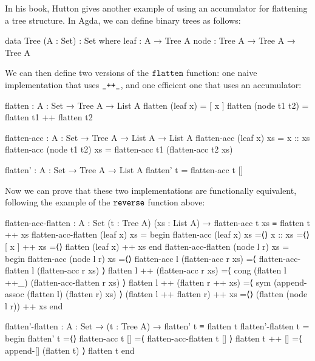 \documentclass[a4paper,UKenglish]{tufte-handout}
\theoremstyle{definition}
\newtheorem{exercise}{Exercise}[section]
\newcommand\fun[1]{{\AgdaFunction{#1}}}
\begin{document}
In his book, Hutton gives another example of using
an accumulator for flattening a tree structure. In Agda, we can define
binary trees as follows:
\begin{code}[number]
data Tree (A : Set) : Set where
  leaf  : A → Tree A
  node  : Tree A → Tree A → Tree A
\end{code}
We can then define two versions of the $\fun{flatten}$ function: one
naive implementation that uses $\fun{\_++\_}$, and one efficient one
that uses an accumulator:
\begin{AgdaAlign}
\begin{AgdaSuppressSpace}
\begin{code}[number]
flatten : {A : Set} → Tree A → List A
flatten (leaf x)      = [ x ]
flatten (node t1 t2)  = flatten t1 ++ flatten t2

\end{code}
\begin{code}[number]
flatten-acc : {A : Set} → Tree A → List A → List A
flatten-acc (leaf x)      xs  = x :: xs
flatten-acc (node t1 t2)  xs  =
  flatten-acc t1 (flatten-acc t2 xs)

\end{code}
\begin{code}[number]
flatten' : {A : Set} → Tree A → List A
flatten' t = flatten-acc t []
\end{code}
\end{AgdaSuppressSpace}
Now we can prove that these two implementations are functionally equivalent,
following the example of the $\fun{reverse}$ function above:
\marginnote{
\begin{exercise}
Complete the proof of $\fun{flatten'-flatten}$.
\end{exercise}
}
\begin{code}[number]
flatten-acc-flatten : {A : Set} (t : Tree A) (xs : List A) → flatten-acc t xs ≡ flatten t ++ xs
flatten-acc-flatten (leaf x)   xs =
  begin
    flatten-acc (leaf x) xs
  =⟨⟩
    x :: xs
  =⟨⟩
    [ x ] ++ xs
  =⟨⟩
    flatten (leaf x) ++ xs
  end
flatten-acc-flatten (node l r) xs =
  begin
    flatten-acc (node l r) xs
  =⟨⟩
    flatten-acc l (flatten-acc r xs)
  =⟨ flatten-acc-flatten l (flatten-acc r xs) ⟩
    flatten l ++ (flatten-acc r xs)
  =⟨ cong (flatten l ++_) (flatten-acc-flatten r xs) ⟩
    flatten l ++ (flatten r ++ xs)
  =⟨ sym (append-assoc (flatten l) (flatten r) xs) ⟩
    (flatten l ++ flatten r) ++ xs
  =⟨⟩
    (flatten (node l r)) ++ xs
  end

flatten'-flatten : {A : Set} → (t : Tree A) → flatten' t ≡ flatten t
flatten'-flatten t =
  begin
    flatten' t
  =⟨⟩
    flatten-acc t []
  =⟨ flatten-acc-flatten t [] ⟩
    flatten t ++ []
  =⟨ append-[] (flatten t) ⟩
    flatten t
  end
\end{code}
\end{AgdaAlign}
\end{document}
